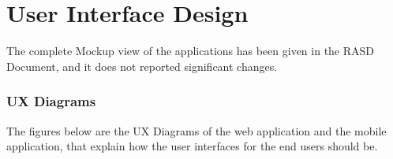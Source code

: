 \chapter{User Interface Design}
The complete Mockup view of the applications has been given in the RASD Document, and it does not reported significant changes.

\subsection{UX Diagrams}
The figures below are the UX Diagrams of the web application and the mobile application, that explain how the user interfaces for the end users should be.
